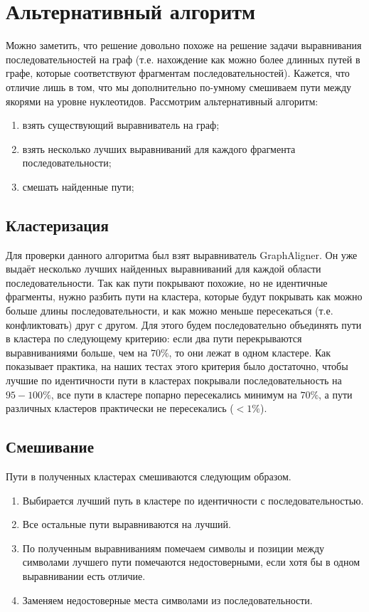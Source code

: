 \documentclass[14pt]{matmex-diploma-custom}
\begin{document}
\section{Альтернативный алгоритм}
Можно заметить, что решение довольно похоже на решение задачи выравнивания последовательностей на граф (т.е. нахождение как можно более длинных путей в графе, которые соответствуют фрагментам последовательностей). Кажется, что отличие лишь в том, что мы дополнительно по-умному смешиваем пути между якорями на уровне нуклеотидов. Рассмотрим альтернативный алгоритм:
\begin{enumerate}
    \item взять существующий выравниватель на граф;
    \item взять несколько лучших выравниваний для каждого фрагмента последовательности;
    \item смешать найденные пути;
\end{enumerate}

\subsection{Кластеризация}
\begin{sloppypar}
Для проверки данного алгоритма был взят выравниватель GraphAligner. Он уже выдаёт несколько лучших найденных выравниваний для каждой области последовательности. Так как пути покрывают похожие, но не идентичные фрагменты, нужно разбить пути на кластера, которые будут покрывать как можно больше длины последовательности, и как можно меньше пересекаться (т.е. конфликтовать) друг с другом. Для этого будем последовательно объединять пути в кластера по следующему критерию: если два пути перекрываются выравниваниями больше, чем на $70\%$, то они лежат в одном кластере. Как показывает практика, на наших тестах этого критерия было достаточно, чтобы лучшие по идентичности пути в кластерах покрывали последовательность на $95-100\%$, все пути в кластере попарно пересекались минимум на $70\%$, а пути различных кластеров практически не пересекались ($<1\%$).
\end{sloppypar}

\subsection{Смешивание}
Пути в полученных кластерах смешиваются следующим образом.
\begin{enumerate}
    \item Выбирается лучший путь в кластере по идентичности с последовательностью.
    \item Все остальные пути выравниваются на лучший.
    \item По полученным выравниваниям помечаем символы и позиции между символами лучшего пути помечаются недостоверными, если хотя бы в одном выравнивании есть отличие.
    \item Заменяем недостоверные места символами из последовательности.
\end{enumerate}
\end{document}

